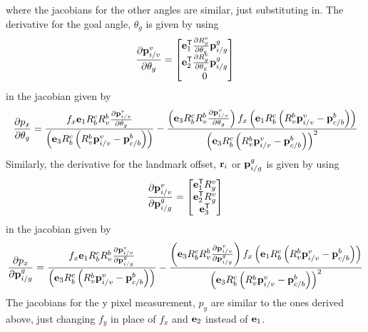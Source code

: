 where the jacobians for the other angles are similar, just substituting in.
The derivative for the goal angle, $\theta_g$ is given by using
\begin{equation}
  \frac{\partial \boldsymbol{\mathrm{p}}_{i/v}^v}{\partial \theta_g} =
  \begin{bmatrix}
    \boldsymbol{\mathrm{e}}_1^{\mathsf{T}} \frac{\partial R_g^v}{\partial \theta_g} \boldsymbol{\mathrm{p}}_{i/g}^g \\
    \boldsymbol{\mathrm{e}}_2^{\mathsf{T}} \frac{\partial R_g^v}{\partial \theta_g} \boldsymbol{\mathrm{p}}_{i/g}^g \\
    0
  \end{bmatrix}
\end{equation}
in the jacobian given by
\begin{equation}
  \frac{\partial p_x}{\partial \theta_g} =
  \frac{f_x \boldsymbol{\mathrm{e}}_1 R_b^c R_v^b \frac{\partial \boldsymbol{\mathrm{p}}_{i/v}^v}{\partial \theta_g}}
    {\left(\boldsymbol{\mathrm{e}}_3 R_b^c \left(R_v^b \boldsymbol{\mathrm{p}}_{i/v}^v -
    \boldsymbol{\mathrm{p}}_{c/b}^b\right)\right)}
    - \frac{\left(\boldsymbol{\mathrm{e}}_3 R_b^c R_v^b \frac{\partial \boldsymbol{\mathrm{p}}_{i/v}^v}{\partial \theta_g} \right) f_x \left(\boldsymbol{\mathrm{e}}_1 R_b^c \left(R_v^b \boldsymbol{\mathrm{p}}_{i/v}^v -
        \boldsymbol{\mathrm{p}}_{c/b}^b\right)\right)} {\left(\boldsymbol{\mathrm{e}}_3 R_b^c \left(R_v^b \boldsymbol{\mathrm{p}}_{i/v}^v -
  \boldsymbol{\mathrm{p}}_{c/b}^b\right)\right)^2}
\end{equation}
Similarly, the derivative for the landmark offset, $\boldsymbol{\mathrm{r}}_i$ or
$\boldsymbol{\mathrm{p}}_{i/g}^g$ is given by using
\begin{equation}
  \frac{\partial \boldsymbol{\mathrm{p}}_{i/v}^v}{\partial \boldsymbol{\mathrm{p}}_{i/g}^g} =
  \begin{bmatrix}
    \boldsymbol{\mathrm{e}}_1^{\mathsf{T}} R_g^v \\
    \boldsymbol{\mathrm{e}}_2^{\mathsf{T}} R_g^v \\
    \boldsymbol{\mathrm{e}}_3^{\mathsf{T}}
  \end{bmatrix}
\end{equation}
in the jacobian given by
\begin{equation}
  \frac{\partial p_x}{\partial \boldsymbol{\mathrm{p}}_{i/g}^g} =
  \frac{f_x \boldsymbol{\mathrm{e}}_1 R_b^c R_v^b \frac{\partial \boldsymbol{\mathrm{p}}_{i/v}^v}{\partial \boldsymbol{\mathrm{p}}_{i/g}^g}}
    {\left(\boldsymbol{\mathrm{e}}_3 R_b^c \left(R_v^b \boldsymbol{\mathrm{p}}_{i/v}^v -
    \boldsymbol{\mathrm{p}}_{c/b}^b\right)\right)}
    - \frac{\left(\boldsymbol{\mathrm{e}}_3 R_b^c R_v^b \frac{\partial \boldsymbol{\mathrm{p}}_{i/v}^v}{\partial \boldsymbol{\mathrm{p}}_{i/g}^g} \right) f_x \left(\boldsymbol{\mathrm{e}}_1 R_b^c \left(R_v^b \boldsymbol{\mathrm{p}}_{i/v}^v -
        \boldsymbol{\mathrm{p}}_{c/b}^b\right)\right)} {\left(\boldsymbol{\mathrm{e}}_3 R_b^c \left(R_v^b \boldsymbol{\mathrm{p}}_{i/v}^v -
  \boldsymbol{\mathrm{p}}_{c/b}^b\right)\right)^2}
\end{equation}
The jacobians for the y pixel measurement, $p_y$ are similar to the ones derived
above, just changing $f_y$ in place of $f_x$ and $\boldsymbol{\mathrm{e}}_2$ instead of $\boldsymbol{\mathrm{e}}_1$.

